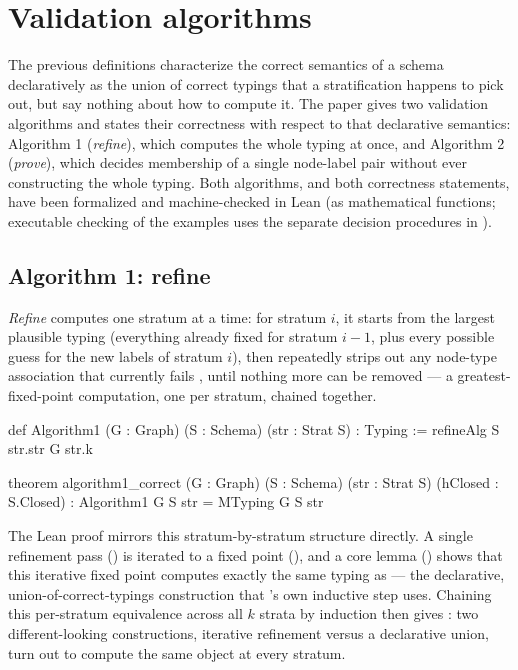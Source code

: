 \section{Validation algorithms} \label{sec:algorithms}

 The previous definitions characterize the correct semantics of a schema
 declaratively as the union of correct typings that a stratification
 happens to pick out, but say nothing about how to compute it.
 The paper
 gives two validation algorithms and states their correctness with respect
 to that declarative semantics:
 Algorithm 1 (\emph{refine}), which computes
 the whole typing  at once,
 and Algorithm 2
 (\emph{prove}), which decides membership of a single node-label pair
 without ever constructing the whole typing. 
 Both algorithms, and both correctness statements, 
  have been formalized and machine-checked in Lean (as mathematical functions; 
   executable checking of the examples uses the separate decision procedures in ).

\subsection{Algorithm 1: refine}

\emph{Refine} computes one stratum at a time: for stratum $i$, it starts
 from the largest plausible typing (everything already fixed for stratum
 $i-1$, plus every possible guess for the new labels of stratum $i$), then
 repeatedly strips out any node-type association that currently fails
 , until nothing more can be removed --- a greatest-fixed-point
 computation, one per stratum, chained together.

\begin{leanlisting}
def Algorithm1 (G : Graph) (S : Schema) (str : Strat S) : Typing :=
  refineAlg S str.str G str.k

theorem algorithm1_correct (G : Graph) (S : Schema) (str : Strat S)
    (hClosed : S.Closed) : Algorithm1 G S str = MTyping G S str
\end{leanlisting}

The Lean proof mirrors this stratum-by-stratum structure directly. A
single refinement pass () is iterated to a fixed point
(), and a core lemma () shows that
this iterative fixed point computes exactly the same typing as
 --- the declarative, union-of-correct-typings construction
that 's own inductive step uses. Chaining this per-stratum
equivalence across all $k$ strata by induction then gives
: two different-looking constructions,
iterative refinement versus a declarative union, turn out to compute the
same object at every stratum.

